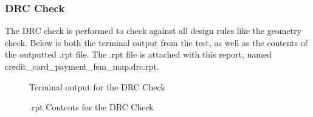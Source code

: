 \documentclass[12pt]{article}
\begin{document}
\subsubsection{DRC Check} %
The DRC check is performed to check against all design rules like the geometry check. Below is both the terminal output from the test, as well as the contents of the outputted .rpt file. The .rpt file is attached with this report, named credit\_card\_payment\_fsm\_map.drc.rpt.
\begin{figure} [H]
    \centering
    \caption{Terminal output for the DRC Check}
\end{figure}


\begin{figure} [H]
    \centering
    \caption{.rpt Contents for the DRC Check}
\end{figure}
\end{document}

